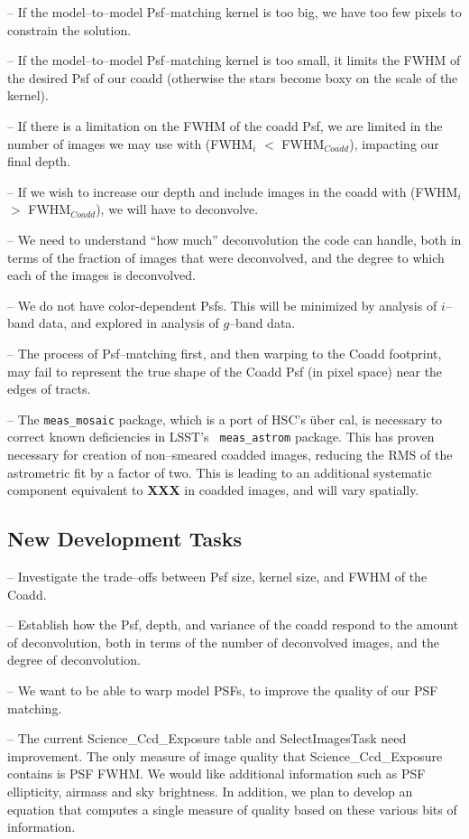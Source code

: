 \documentclass[12pt]{article}
\begin{document}
-- If the model--to--model Psf--matching kernel is too big, we have
too few pixels to constrain the solution.

-- If the model--to--model Psf--matching kernel is too small, it
limits the FWHM of the desired Psf of our coadd (otherwise the stars
become boxy on the scale of the kernel).

-- If there is a limitation on the FWHM of the coadd Psf, we are
limited in the number of images we may use with (FWHM$_i$ $<$
FWHM$_{Coadd}$), impacting our final depth.

-- If we wish to increase our depth and include images in the coadd
with (FWHM$_i$ $>$ FWHM$_{Coadd}$), we will have to deconvolve.

-- We need to understand ``how much'' deconvolution the code can handle,
both in terms of the fraction of images that were deconvolved, and the
degree to which each of the images is deconvolved.

-- We do not have color-dependent Psfs.  This will be minimized by
analysis of $i$--band data, and explored in analysis of $g$--band
data.

-- The process of Psf--matching first, and then warping to the Coadd
footprint, may fail to represent the true shape of the Coadd Psf (in
pixel space) near the edges of tracts.

-- The {\tt meas\_mosaic} package, which is a port of HSC's \"{u}ber
cal, is necessary to correct known deficiencies in LSST's {\tt
  meas\_astrom} package.  This has proven necessary for creation of
non--smeared coadded images, reducing the RMS of the astrometric fit
by a factor of two.  This is leading to an additional systematic
component equivalent to {\bf XXX} in coadded images, and will vary
spatially.

\subsection{New Development Tasks}

-- Investigate the trade--offs between Psf size, kernel size, and FWHM
of the Coadd.

-- Establish how the Psf, depth, and variance of the coadd respond to
the amount of deconvolution, both in terms of the number of
deconvolved images, and the degree of deconvolution.

-- We want to be able to warp model PSFs, to improve the quality of our PSF matching.

-- The current Science\_Ccd\_Exposure table and SelectImagesTask need improvement.
The only measure of image quality that Science\_Ccd\_Exposure contains is PSF FWHM.
We would like additional information such as PSF ellipticity, airmass and sky brightness.
In addition, we plan to develop an equation that computes a single measure of quality
based on these various bits of information.
\end{document}

